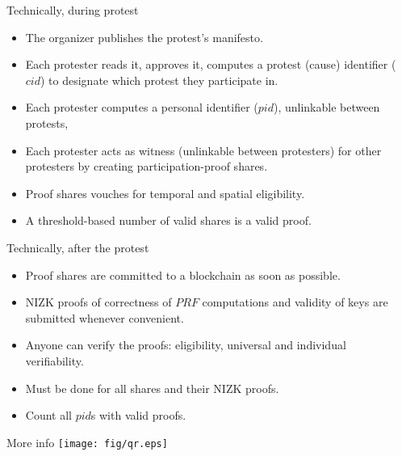 \begin{columns}[t]
\begin{column}{0.32\linewidth}
    \begin{blackblock}{Technically, during protest}
      \begin{itemize}
        \item The organizer publishes the protest's manifesto.
        \item Each protester reads it, approves it, computes a protest (cause) 
          identifier (\(cid\)) to designate which protest they participate in.
        \item Each protester computes a personal identifier (\(pid\)), 
          unlinkable between protests,
        \item Each protester acts as witness (unlinkable between protesters) for 
          other protesters by creating participation-proof shares.
        \item Proof shares vouches for temporal and spatial eligibility.
        \item A threshold-based number of valid shares is a valid proof.
      \end{itemize}
    \end{blackblock}

    \begin{blackblock}{Technically, after the protest}
      \begin{itemize}
        \item Proof shares are committed to a blockchain as soon as possible.
        \item \Ac{NIZK} proofs of correctness of \(PRF\) computations and 
          validity of keys are submitted whenever convenient.
        \item Anyone can verify the proofs: eligibility, universal and 
          individual verifiability.
        \item Must be done for all shares and their \ac{NIZK} proofs.
        \item Count all \(pid\)s with valid proofs.
      \end{itemize}
    \end{blackblock}

    \begin{block}{More info}
      \centering
      \texttt{[image: fig/qr.eps]}
    \end{block}

    \printbibliography[heading=none]

  \end{column}

  \hfill

  \begin{column}{0.32\linewidth}


\end{column}
\end{columns}
